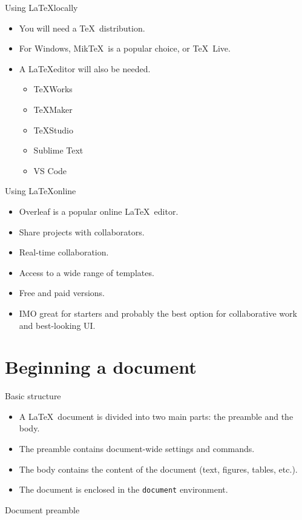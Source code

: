 \documentclass[t,12pt,xcolor=dvipsnames]{beamer}
\begin{document}
\begin{frame}{Using \LaTeX locally}
    \begin{itemize}
        \item You will need a \TeX \ distribution.
        \item For Windows, Mik\TeX \ is a popular choice, or \TeX \ Live.
        \item A \LaTeX editor will also be needed.
        \begin{itemize}
            \item \TeX Works
            \item \TeX Maker
            \item \TeX Studio
            \item Sublime Text
            \item VS Code
        \end{itemize}
    \end{itemize}
\end{frame}

\begin{frame}{Using \LaTeX online}
    \begin{itemize}
        \item Overleaf is a popular online \LaTeX \ editor.
        \item Share projects with collaborators.
        \item Real-time collaboration.
        \item Access to a wide range of templates.
        \item Free and paid versions.
        \item IMO great for starters and probably the best option for collaborative work and best-looking UI.
    \end{itemize}
\end{frame}

\section{Beginning a document}

\begin{frame}{Basic structure}
    \begin{itemize}
        \item A \LaTeX \ document is divided into two main parts: the preamble and the body.
        \item The preamble contains document-wide settings and commands.
        \item The body contains the content of the document (text, figures, tables, etc.).
        \item The document is enclosed in the \texttt{document} environment.
    \end{itemize}
\end{frame}

\begin{frame}{Document preamble}
    
\end{frame}
\end{document}
